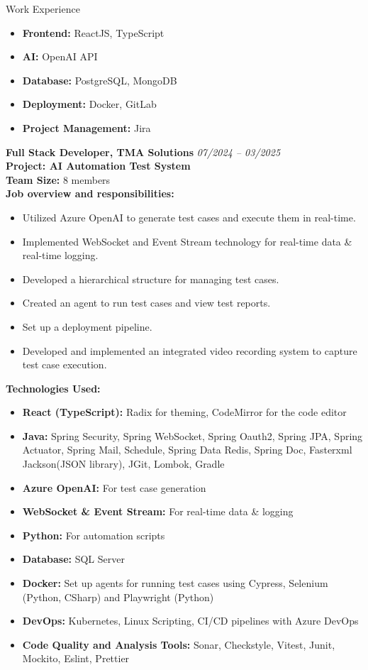 \documentclass{resume} %
\begin{document}
\begin{rSection}{Work Experience}
\begin{itemize}
    \item \textbf{Frontend:} ReactJS, TypeScript
    \item \textbf{AI:} OpenAI API
    \item \textbf{Database:} PostgreSQL, MongoDB
    \item \textbf{Deployment:} Docker, GitLab
    \item \textbf{Project Management:} Jira
\end{itemize}
{\bf Full Stack Developer, TMA Solutions} \hfill {\em 07/2024 – 03/2025}
\\ \textbf{Project: AI Automation Test System}
\\ \textbf{Team Size:} 8 members
\\ \textbf{Job overview and responsibilities:}
\begin{itemize}
    \item Utilized Azure OpenAI to generate test cases and execute them in real-time.
    \item Implemented WebSocket and Event Stream technology for real-time data \& real-time logging.
    \item Developed a hierarchical structure for managing test cases.
    \item Created an agent to run test cases and view test reports.
    \item Set up a deployment pipeline.
    \item Developed and implemented an integrated video recording system to capture test case execution.
\end{itemize}
\textbf{Technologies Used:}
\begin{itemize}
    \item \textbf{React (TypeScript):} Radix for theming, CodeMirror for the code editor
    \item \textbf{Java:} Spring Security, Spring WebSocket, Spring Oauth2, Spring JPA, Spring Actuator, Spring Mail, Schedule, Spring Data Redis, Spring Doc, Fasterxml Jackson(JSON library), JGit, Lombok, Gradle
    \item \textbf{Azure OpenAI:} For test case generation
    \item \textbf{WebSocket \& Event Stream:} For real-time data \& logging 
    \item \textbf{Python:} For automation scripts
    \item \textbf{Database:} SQL Server
    \item \textbf{Docker:} Set up agents for running test cases using Cypress, Selenium (Python, CSharp) and Playwright (Python)
    \item \textbf{DevOps:} Kubernetes, Linux Scripting, CI/CD pipelines with Azure DevOps
    \item \textbf{Code Quality and Analysis Tools:} Sonar, Checkstyle, Vitest, Junit, Mockito, Eslint, Prettier
\end{itemize}


\end{rSection}
\end{document}
